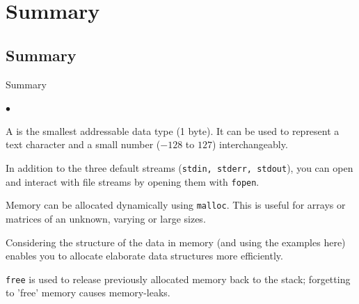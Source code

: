 \documentclass[smaller,handout,table]{beamer}
\begin{document}
\section{Summary}
\subsection{Summary}
\begin{frame}{Summary}
\begin{list}{$\bullet$}{}
\item A  is the smallest addressable data type (1 byte). It can be used to represent a text character and a small number ($-128$ to $127$) interchangeably.
\item In addition to the three default streams (\texttt{stdin, stderr, stdout}), you can open and interact with file streams by opening them with \texttt{fopen}.
\item Memory can be allocated dynamically using \texttt{malloc}. This is useful for arrays or matrices of an unknown, varying or large sizes.
\item Considering the structure of the data in memory (and using the examples here) enables you to allocate elaborate data structures more efficiently.
\item \texttt{free} is used to release previously allocated memory back to the stack; forgetting to 'free' memory causes memory-leaks.
\end{list}
\end{frame}
\end{document}
